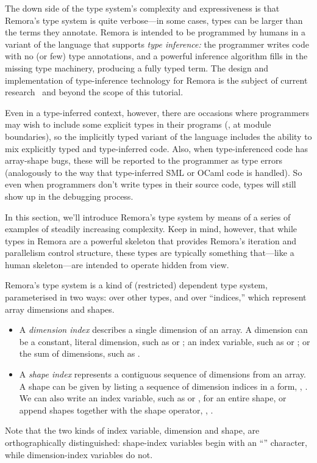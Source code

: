 The down side of the type system's complexity and expressiveness
is that Remora's type system is quite verbose---in some cases, types can 
be larger than the terms they annotate.
Remora is intended to be programmed by humans in a variant of the
language that supports \emph{type inference:}
the programmer writes code with no (or few) type annotations,
and a powerful inference algorithm fills in the missing type machinery,
producing a fully typed term.
The design and implementation of type-inference technology for Remora
is the subject of current research~\cite{Slepak:PhD}
and beyond the scope of this tutorial.

Even in a type-inferred context, however,
there are occasions where programmers may wish to include
some explicit types in their programs
(\eg, at module boundaries), 
so the implicitly typed
variant of the language includes the ability to mix explicitly typed
and type-inferred code.
Also, when type-inferenced code has array-shape bugs,
these will be reported to the programmer as type errors
(analogously to the way that type-inferred SML or OCaml code is
handled).
So even when programmers don't write types in their source code,
types will still show up in the debugging process.

In this section, we'll introduce Remora's type system by means of a series
of examples of steadily increasing complexity.
Keep in mind, however, that while types in Remora are a powerful skeleton that
provides Remora's iteration and parallelism control structure,
these types are typically something that---like a human skeleton---are
intended to operate hidden from view.


Remora's type system is a kind of (restricted) dependent type system,
parameterised in two ways: over other types, and over ``indices,''
which represent array dimensions and shapes.
\begin{itemize}
\item A \emph{dimension index} describes a single dimension of an
      array. A dimension can be a constant, literal dimension, such
      as  or ; an index variable, such as  or
      ; or the sum of dimensions, such as .

\item A \emph{shape index} represents a contiguous sequence of dimensions
      from an array. A shape can be given by listing a sequence of
      dimension indices in a  form, \eg,
      .
      We can also write an index variable, such as  or ,
      for an entire shape,
      or append shapes together with the \ex{++} shape operator,
      \eg, .
\end{itemize}
Note that the two kinds of index variable, dimension and shape,
are or\-tho\-graph\-i\-cal\-ly distinguished:
shape-index variables begin with an ``'' character, while
dimension-index variables do not.

